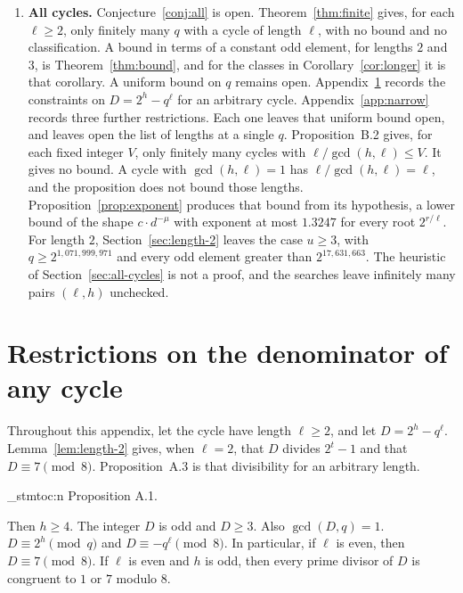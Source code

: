 \documentclass[11pt]{article}
\newenvironment{named}[1]{%
  \par\addvspace{\medskipamount}%
  \pagebreak[3]%
  \noindent{\bfseries #1}\space\ignorespaces
  \stmtoc{#1}%
}{\par\addvspace{\medskipamount}}
\newcommand{\stmtoc}[1]{ \qn_stmtoc:n {#1} }
\begin{document}
\begin{enumerate}
\item \textbf{All cycles.}
Conjecture~\ref{conj:all} is open.
Theorem~\ref{thm:finite} gives, for each $\ell \ge 2$, only finitely many $q$ with a cycle of length $\ell$, with no bound and no classification.
A bound in terms of a constant odd element, for lengths $2$ and $3$, is Theorem~\ref{thm:bound}, and for the classes in Corollary~\ref{cor:longer} it is that corollary.
A uniform bound on $q$ remains open.
Appendix~\ref{app:denominator} records the constraints on $D = 2^h - q^\ell$ for an arbitrary cycle.
Appendix~\ref{app:narrow} records three further restrictions.
Each one leaves that uniform bound open, and leaves open the list of lengths at a single $q$.
Proposition~B.2 gives, for each fixed integer $V$, only finitely many cycles with $\ell/\gcd(h,\ell) \le V$.
It gives no bound.
A cycle with $\gcd(h,\ell) = 1$ has $\ell/\gcd(h,\ell) = \ell$, and the proposition does not bound those lengths.
Proposition~\ref{prop:exponent} produces that bound from its hypothesis, a lower bound of the shape $c \cdot d^{-\mu}$ with exponent at most $1.3247$ for every root $2^{r/\ell}$.
For length $2$, Section~\ref{sec:length-2} leaves the case $u \ge 3$, with $q \ge 2^{1{,}071{,}999{,}971}$ and every odd element greater than $2^{17{,}631{,}663}$.
The heuristic of Section~\ref{sec:all-cycles} is not a proof, and the searches leave infinitely many pairs $(\ell, h)$ unchecked.
\end{enumerate}

\appendix

\section{Restrictions on the denominator of any cycle}
\label{app:denominator}

Throughout this appendix, let the cycle have length $\ell \ge 2$, and let $D = 2^h - q^\ell$.
Lemma~\ref{lem:length-2} gives, when $\ell = 2$, that $D$ divides $2^t - 1$ and that $D \equiv 7 \pmod{8}$.
Proposition~A.3 is that divisibility for an arbitrary length.

\begin{named}{Proposition A.1.}
Then $h \ge 4$.
The integer $D$ is odd and $D \ge 3$.
Also $\gcd(D, q) = 1$.
$D \equiv 2^h \pmod{q}$ and $D \equiv -q^\ell \pmod{8}$.
In particular, if $\ell$ is even, then $D \equiv 7 \pmod{8}$.
If $\ell$ is even and $h$ is odd, then every prime divisor of $D$ is congruent to $1$ or $7$ modulo $8$.
\end{named}
\end{document}
